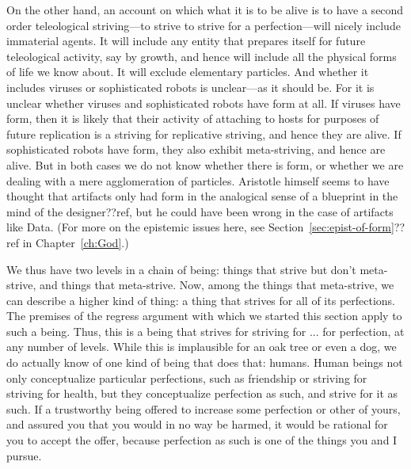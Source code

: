 On the other hand, an account on which what it is to be alive is to have a second order teleological striving---to strive to strive for a perfection---will nicely
include immaterial agents. It will include any entity that prepares itself for future teleological activity, say by growth,
and hence will include all the physical forms of life we know about. It will exclude elementary particles. And whether it includes viruses or sophisticated
robots is unclear---as it should be. For it is unclear whether viruses and sophisticated robots have form at all. If viruses have form, then it is likely
that their activity of attaching to hosts for purposes of future replication is a striving for replicative striving, and hence they are alive. If sophisticated robots have form, they also exhibit meta-striving, and hence are alive. But in both cases we do not
know whether there is form, or whether we are dealing with a mere agglomeration of particles.
Aristotle himself seems to have thought that
artifacts only had form in the analogical sense of a blueprint in the mind of the designer??ref, but he could have been wrong in the case of artifacts like Data.
(For more on the epistemic issues here, see Section~\ref{sec:epist-of-form}??ref
in Chapter~\ref{ch:God}.)

We thus have two levels in a chain of being: things that strive but don't meta-strive, and things that meta-strive. Now, among the things that meta-strive,
we can describe a higher kind of thing: a thing that strives for all of its perfections. The premises of the regress argument with which we started this
section apply to such a being. Thus, this is a being that strives for striving for ... for perfection, at any number of levels. While this is implausible
for an oak tree or even a dog, we do actually know of one kind of being that does that: humans. Human beings not only conceptualize particular perfections, such as friendship
or striving for striving for health, but they conceptualize perfection as such, and strive for it as such. If a trustworthy being offered to increase
some perfection or other of yours, and assured you that you would in no way be harmed, it would be rational for you to accept the offer, because perfection as
such is one of the things you and I pursue.

